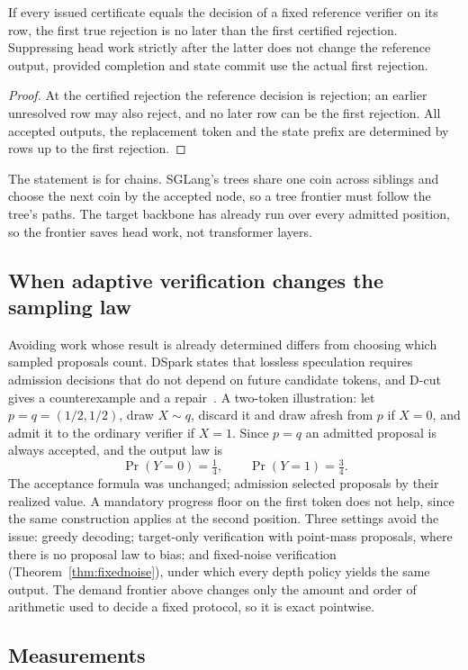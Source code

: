 \begin{proposition}\label{prop:frontier}
If every issued certificate equals the decision of a fixed reference verifier on its row, the first true rejection is no later than the first certified rejection. Suppressing head work strictly after the latter does not change the reference output, provided completion and state commit use the actual first rejection.
\end{proposition}
\begin{proof}
At the certified rejection the reference decision is rejection; an earlier unresolved row may also reject, and no later row can be the first rejection. All accepted outputs, the replacement token and the state prefix are determined by rows up to the first rejection.
\end{proof}
The statement is for chains. SGLang's trees share one coin across siblings and choose the next coin by the accepted node, so a tree frontier must follow the tree's paths. The target backbone has already run over every admitted position, so the frontier saves head work, not transformer layers.

\subsection{When adaptive verification changes the sampling law}\label{sec:stopping}
Avoiding work whose result is already determined differs from choosing which sampled proposals count. DSpark states that lossless speculation requires admission decisions that do not depend on future candidate tokens, and D-cut gives a counterexample and a repair~\cite{dspark,dcut}. A two-token illustration: let $p=q=(1/2,1/2)$, draw $X\sim q$, discard it and draw afresh from $p$ if $X=0$, and admit it to the ordinary verifier if $X=1$. Since $p=q$ an admitted proposal is always accepted, and the output law is
\begin{equation}
\Pr(Y=0)=\tfrac14,\qquad\Pr(Y=1)=\tfrac34.\label{eq:bias}
\end{equation}
The acceptance formula was unchanged; admission selected proposals by their realized value. A mandatory progress floor on the first token does not help, since the same construction applies at the second position. Three settings avoid the issue: greedy decoding; target-only verification with point-mass proposals, where there is no proposal law to bias; and fixed-noise verification (Theorem~\ref{thm:fixednoise}), under which every depth policy yields the same output. The demand frontier above changes only the amount and order of arithmetic used to decide a fixed protocol, so it is exact pointwise.

\subsection{Measurements}\label{sec:decisions-measured}

